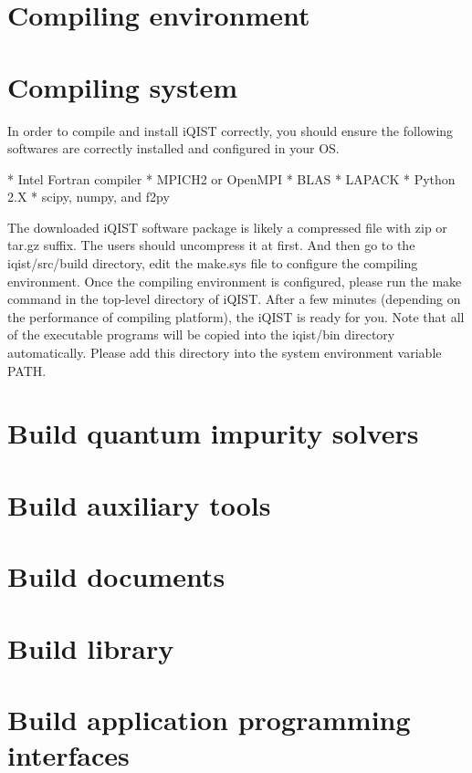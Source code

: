 \section{Compiling environment}

\section{Compiling system}

In order to compile and install iQIST correctly, you should ensure the
following softwares are correctly installed and configured in your OS.

* Intel Fortran compiler
* MPICH2 or OpenMPI
* BLAS
* LAPACK
* Python 2.X
* scipy, numpy, and f2py

The downloaded iQIST software package is likely a compressed file with zip
or tar.gz suffix. The users should uncompress it at first. And then go to
the iqist/src/build directory, edit the make.sys file to configure the
compiling environment. Once the compiling environment is configured,
please run the make command in the top-level directory of iQIST. After a
few minutes (depending on the performance of compiling platform), the
iQIST is ready for you. Note that all of the executable programs will be
copied into the iqist/bin directory automatically. Please add this
directory into the system environment variable PATH.

\section{Build quantum impurity solvers}
\section{Build auxiliary tools}
\section{Build documents}
\section{Build library}
\section{Build application programming interfaces}
